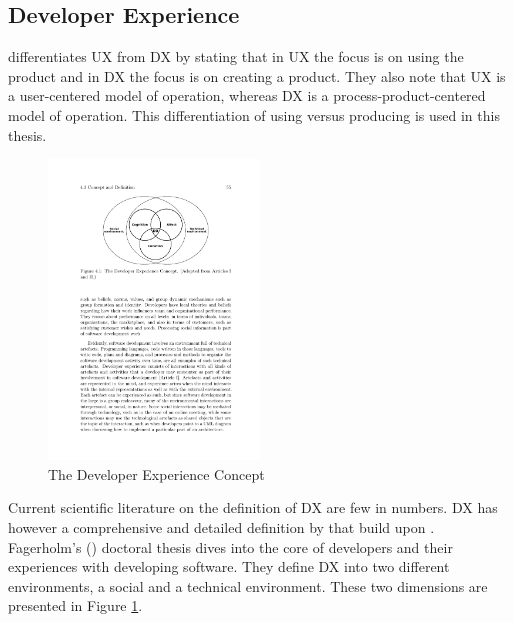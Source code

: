 \documentclass[english, 12pt, a4paper, sci, utf8, a-1b, online]{aaltothesis}
\begin{document}

\subsection{Developer Experience}


\textcite[167]{moilanen2018api} differentiates UX from DX by stating that in UX the focus is on using the product and in DX the focus is on creating a product. They also note that UX is a user-centered model of operation, whereas DX is a process-product-centered model of operation. This differentiation of using versus producing is used in this thesis.

\begin{figure}[H]
  \begin{center}
    \includegraphics[width=0.5\textwidth]{dx-social-technical.pdf}
  \end{center}
  \captionsetup{width=0.5\textwidth}
  \caption{The Developer Experience Concept \parencite{fagerholm-doctoral-thesis}}
  \label{figure:social-technical}
\end{figure}

Current scientific literature on the definition of DX are few in numbers. DX has however a comprehensive and detailed definition by \textcite{fagerholm-doctoral-thesis} that build upon \textcite{fagerholm-dx-concept-and-definition}. Fagerholm's (\citeyear{fagerholm-doctoral-thesis}) doctoral thesis dives into the core of developers and their experiences with developing software. They define DX into two different environments, a social and a technical environment. These two dimensions are presented in Figure \ref{figure:social-technical}.
\end{document}
